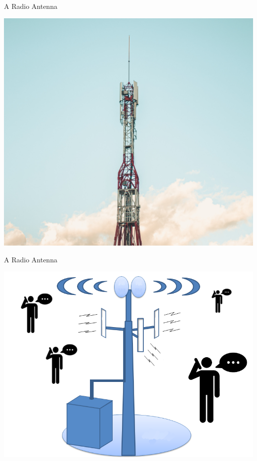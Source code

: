 \documentclass[10 pt]{beamer}
\begin{document}
\begin{frame}{A Radio Antenna}
\begin{center}
  \includegraphics [width=\textwidth]{radio.jpg} 
\end{center}

\end{frame}
\begin{frame}{A Radio Antenna}
\begin{center}
  \includegraphics[scale=0.3]{btsppl.png}

\end{center}

\end{frame}
\end{document}
